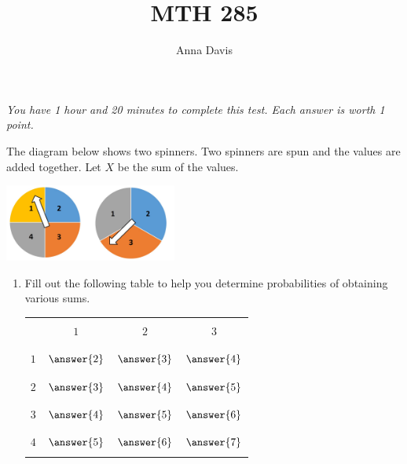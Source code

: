 \documentclass{ximera}
\author{Anna Davis} \title{MTH 285}
\begin{document}
\begin{abstract}

\end{abstract}
\maketitle
 \textit{You have 1 hour and 20 minutes to complete this test.  Each answer is worth 1 point.}
\begin{problem}\label{prob:exam2prob1}
The diagram below shows two spinners.  Two spinners are spun and the values are added together.  Let $X$ be the sum of the values.  

\begin{image}
   
\includegraphics[height=1in]{test2spinners.jpg}
 
\end{image}



\begin{enumerate}
    \item Fill out the following table to help you determine probabilities of obtaining various sums.
    
\begin{center}
\begin{tabular}{|c|c|c|c|}
 \hline
 && &   \\
 & $1$& $2$ &$3$ \\
 && &   \\
  \hline
  && & \\
 $1$&$\answer{2}$&$\answer{3}$&$\answer{4}$ \\
  &&& \\
 \hline
  &&& \\
 $2$&$\answer{3}$&$\answer{4}$ &$\answer{5}$ \\
  &&& \\
 \hline
  &&& \\
  $3$&$\answer{4}$&$\answer{5}$  &$\answer{6}$ \\
  &&& \\
 \hline
 &&& \\
  $4$&$\answer{5}$&$\answer{6}$  &$\answer{7}$ \\
  &&& \\
 \hline
 \end{tabular}
\end{center}    
    

\end{enumerate}
\end{problem}
\end{document}
